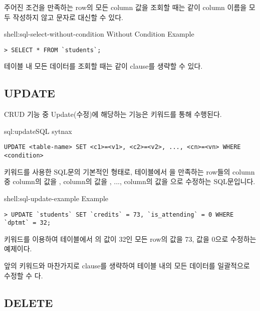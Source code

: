 주어진 조건을 만족하는 row의 모든 column 값을 조회할 때는 \와 같이 column 이름을 모두 작성하지 않고 \cd{*} 문자로 대신할 수 있다.

\begin{shellenv}{shell:sql-select-without-condition}{ Without Condition Example}\begin{verbatim}
> SELECT * FROM `students`;
\end{verbatim}
\end{shellenv}

테이블 내 모든 데이터를 조회할 때는 \과 같이  clause를 생략할 수 있다.

\subsection*{UPDATE}

CRUD 기능 중 Update(수정)에 해당하는 기능은  키워드를 통해 수행된다.

\begin{sqlenv}{sql:update}{SQL  sytnax}\begin{verbatim}
UPDATE <table-name> SET <c1>=<v1>, <c2>=<v2>, ..., <cn>=<vn> WHERE <condition>
\end{verbatim}
\end{sqlenv}

\는  키워드를 사용한 SQL문의 기본적인 형태로,  테이블에서 을 만족하는 row들의 column 중  column의 값을 ,  column의 값을 , ...,  column의 값을 으로 수정하는 SQL문입니다.

\begin{shellenv}{shell:sql-update-example}{ Example}\begin{verbatim}
> UPDATE `students` SET `credits` = 73, `is_attending` = 0 WHERE `dptmt` = 32;
\end{verbatim}
\end{shellenv}

\은  키워드를 이용하여  테이블에서 의 값이 32인 모든 row의  값을 73,  값을 0으로 수정하는 예제이다.

앞의  키워드와 마찬가지로  clause를 생략하여 테이블 내의 모든 데이터를 일괄적으로 수정할 수 다.

\subsection*{DELETE}

